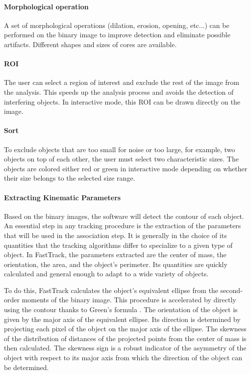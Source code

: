         \paragraph{Morphological operation}
        A set of morphological operations (dilation, erosion, opening, etc...) can be performed on the binary image to improve detection and eliminate possible artifacts. Different shapes and sizes of cores are available.
        \paragraph{ROI}
        The user can select a region of interest and exclude the rest of the image from the analysis. This speeds up the analysis process and avoids the detection of interfering objects. In interactive mode, this ROI can be drawn directly on the image.
        \paragraph{Sort}
        To exclude objects that are too small for noise or too large, for example, two objects on top of each other, the user must select two characteristic sizes. The objects are colored either red or green in interactive mode depending on whether their size belongs to the selected size range.
        \paragraph{Extracting Kinematic Parameters}
        Based on the binary images, the software will detect the contour of each object. An essential step in any tracking procedure is the extraction of the parameters that will be used in the association step. It is generally in the choice of its quantities that the tracking algorithms differ to specialize to a given type of object. In FastTrack, the parameters extracted are the center of mass, the orientation, the area, and the object's perimeter. Its quantities are quickly calculated and general enough to adapt to a wide variety of objects.

        To do this, FastTrack calculates the object's equivalent ellipse from the second-order moments of the binary image. This procedure is accelerated by directly using the contour thanks to Green's formula \cite{}. The orientation of the object is given by the major axis of the equivalent ellipse. Its direction is determined by projecting each pixel of the object on the major axis of the ellipse. The skewness of the distribution of distances of the projected points from the center of mass is then calculated. The skewness sign is a robust indicator of the asymmetry of the object with respect to its major axis from which the direction of the object can be determined.

